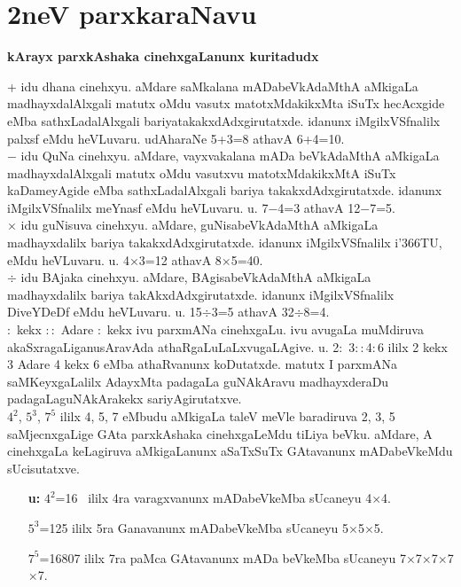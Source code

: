 \chapter{2neV parxkaraNavu}

\centerline{{\huge\bfseries kArayx parxkAshaka cinehxgaLanunx kuritadudx}}
\smallskip

+ idu dhana cinehxyu. aMdare saMkalana mADabeVkAdaMthA aMkigaLa madhayxdalAlxgali matutx oMdu vasutx matotxMdakikxMta iSuTx hecAcxgide eMba sathxLadalAlxgali bariyatakakxdAdxgirutatxde. idanunx iMgilxVSfnalilx palxsf eMdu heVLuvaru. udAharaNe 5+3=8 athavA 6+4=10.\\

$-$ idu QuNa cinehxyu. aMdare, vayxvakalana mADa beVkAdaMthA aMkigaLa madhayxdalAlxgali matutx oMdu \hbox{vasutxvu} matotxMdakikxMtA iSuTx kaDameyAgide eMba sathxLadalAlxgali bariya takakxdAdxgirutatxde. idanunx iMgilxVSfnalilx meYnasf eMdu heVLuvaru. u. 7$-$4=3 athavA 12$-$7=5.\\

$\times$ idu guNisuva cinehxyu. aMdare, guNisabeVkAdaMthA aMkigaLa madhayxdalilx bariya takakxdAdxgirutatxde. idanunx iMgilxVSfnalilx i\char'366TU, eMdu heVLuvaru. u. 4$\times$3=12 athavA 8$\times$5=40.\\

$\div$ idu BAjaka cinehxyu. aMdare, BAgisabeVkAdaMthA aMkigaLa madhayxdalilx bariya takAkxdAdxgirutatxde. idanunx iMgilxVSfnalilx DiveYDeDf eMdu heVLuvaru. u. 15$\div$3=5 athavA 32$\div$8=4.\\

$\colon$ kekx $\colon\colon$ Adare $\colon$ kekx ivu parxmANa cinehxgaLu. ivu avugaLa muMdiruva akaSxragaLiganusAravAda athaRgaLuLaLxvugaLAgive. u. 2$\colon$ 3$\colon\colon$4$\colon$6 ililx 2 kekx 3 Adare 4 kekx 6 eMba athaRvanunx koDutatxde. matutx I parxmANa saMKeyxgaLalilx AdayxMta padagaLa guNAkAravu madhayxderaDu padagaLaguNAkArakekx sariyAgirutatxve.\\


$\text{4}^{\text{2}}$, ${\text{5}}^{\text{3}}$, ${\text{7}}^{\text{5}}$ ililx 4, 5, 7 eMbudu aMkigaLa taleV meVle baradiruva 2, 3, 5 saMjecnxgaLige GAta parxkAshaka cinehxgaLeMdu tiLiya beVku. aMdare, A cinehxgaLa keLagiruva aMkigaLanunx aSaTxSuTx GAtavanunx mADabeVkeMdu sUcisutatxve.\\

\begin{itemize}
\item[{\bf u:}] $\text{4}^{\text{2}}$=16 \ ililx 4ra varagxvanunx mADabeVkeMba sUcaneyu 4$\times$4.


$\text{5}^{\text{3}}$=125 ililx 5ra Ganavanunx mADabeVkeMba sUcaneyu
5$\times$5$\times$5.


$\text{7}^{\text{5}}$=16807 ililx 7ra paMca GAtavanunx mADa beVkeMba sUcaneyu 7$\times$7$\times$7$\times$7$\times$7.
\end{itemize}

